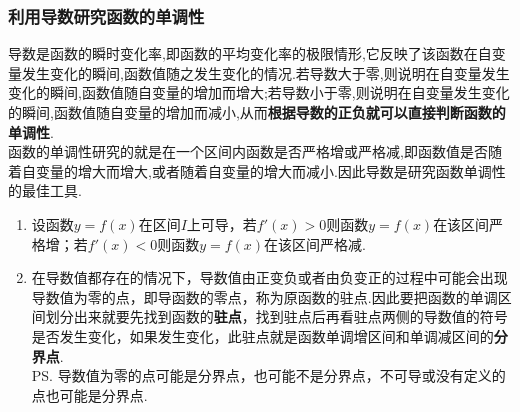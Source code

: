 \subsubsection*{利用导数研究函数的单调性}
导数是函数的瞬时变化率,即函数的平均变化率的极限情形,它反映了该函数在自变量发生变化的瞬间,函数值随之发生变化的情况.若导数大于零,则说明在自变量发生变化的瞬间,函数值随自变量的增加而增大;若导数小于零,则说明在自变量发生变化的瞬间,函数值随自变量的增加而减小,从而\textbf{根据导数的正负就可以直接判断函数的单调性}. \\
函数的单调性研究的就是在一个区间内函数是否严格增或严格减,即函数值是否随着自变量的增大而增大,或者随着自变量的增大而减小.因此导数是研究函数单调性的最佳工具.
\begin{enumerate}
    \item 设函数$y = f(x)$在区间$I$上可导，若$f'(x) > 0$则函数$y = f(x)$在该区间严格增；若$f'(x) < 0$则函数$y = f(x)$在该区间严格减.
    \begin{example}
    \end{example}
    \item 在导数值都存在的情况下，导数值由正变负或者由负变正的过程中可能会出现导数值为零的点，即导函数的零点，称为原函数的驻点.因此要把函数的单调区间划分出来就要先找到函数的\textbf{驻点}，找到驻点后再看驻点两侧的导数值的符号是否发生变化，如果发生变化，此驻点就是函数单调增区间和单调减区间的\textbf{分界点}. \\
    \ps 导数值为零的点可能是分界点，也可能不是分界点，不可导或没有定义的点也可能是分界点.
    \begin{example}
    \end{example}
\end{enumerate}
